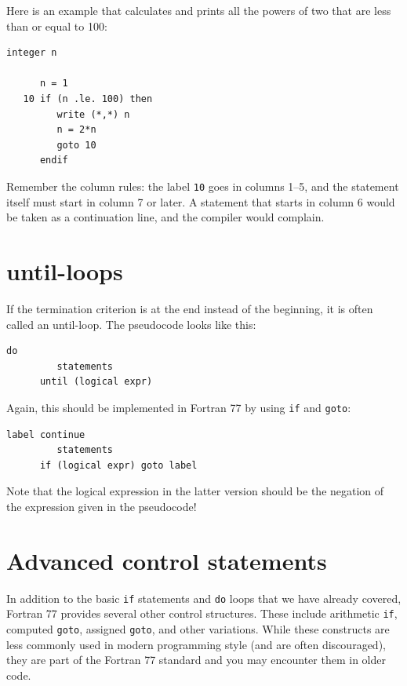 Here is an example that calculates and prints all the powers of two that are less than or equal to 100:

\begin{lstlisting}[style=fortran77]
      integer n

      n = 1
   10 if (n .le. 100) then
         write (*,*) n
         n = 2*n
         goto 10
      endif
\end{lstlisting}

Remember the column rules: the label \texttt{10} goes in columns 1--5, and the statement itself must start in column 7 or later. A statement that starts in column 6 would be taken as a continuation line, and the compiler would complain.

\section{until-loops}

If the termination criterion is at the end instead of the beginning, it is often called an until-loop. The pseudocode looks like this:

\begin{lstlisting}[style=fortran77]
      do
         statements
      until (logical expr)
\end{lstlisting}

Again, this should be implemented in Fortran 77 by using \texttt{if} and \texttt{goto}:

\begin{lstlisting}[style=fortran77]
label continue
         statements
      if (logical expr) goto label
\end{lstlisting}

Note that the logical expression in the latter version should be the negation of the expression given in the pseudocode!

\section{Advanced control statements}

In addition to the basic \texttt{if} statements and \texttt{do} loops that we have already covered, Fortran 77 provides several other control structures. These include arithmetic \texttt{if}, computed \texttt{goto}, assigned \texttt{goto}, and other variations. While these constructs are less commonly used in modern programming style (and are often discouraged), they are part of the Fortran 77 standard and you may encounter them in older code.

